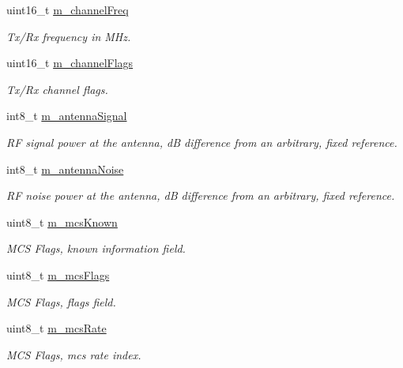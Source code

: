 \begin{DoxyCompactItemize}
uint16\+\_\+t \hyperlink{classns3_1_1RadiotapHeader_aee1725754e23881dd23c73d75c3417a7}{m\+\_\+channel\+Freq}
\begin{DoxyCompactList}\small\item\em Tx/\+Rx frequency in M\+Hz. \end{DoxyCompactList}\item 
uint16\+\_\+t \hyperlink{classns3_1_1RadiotapHeader_a83224ae4fad31022b47599c1fea398af}{m\+\_\+channel\+Flags}
\begin{DoxyCompactList}\small\item\em Tx/\+Rx channel flags. \end{DoxyCompactList}\item 
int8\+\_\+t \hyperlink{classns3_1_1RadiotapHeader_a53a38d27f954ad23e3178c5894f91479}{m\+\_\+antenna\+Signal}
\begin{DoxyCompactList}\small\item\em RF signal power at the antenna, dB difference from an arbitrary, fixed reference. \end{DoxyCompactList}\item 
int8\+\_\+t \hyperlink{classns3_1_1RadiotapHeader_aff9eb044c000563934b7b88edad4ef17}{m\+\_\+antenna\+Noise}
\begin{DoxyCompactList}\small\item\em RF noise power at the antenna, dB difference from an arbitrary, fixed reference. \end{DoxyCompactList}\item 
uint8\+\_\+t \hyperlink{classns3_1_1RadiotapHeader_a2e855f91745b563d56c121a0c493950f}{m\+\_\+mcs\+Known}
\begin{DoxyCompactList}\small\item\em M\+CS Flags, known information field. \end{DoxyCompactList}\item 
uint8\+\_\+t \hyperlink{classns3_1_1RadiotapHeader_aaec55970b628d47aff49162578ab00eb}{m\+\_\+mcs\+Flags}
\begin{DoxyCompactList}\small\item\em M\+CS Flags, flags field. \end{DoxyCompactList}\item 
uint8\+\_\+t \hyperlink{classns3_1_1RadiotapHeader_a10f2171a51d9d199917fb066d0d7aa74}{m\+\_\+mcs\+Rate}
\begin{DoxyCompactList}\small\item\em M\+CS Flags, mcs rate index. \end{DoxyCompactList}\item 

\end{DoxyCompactItemize}
